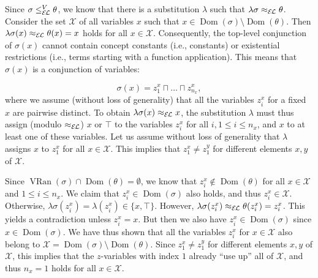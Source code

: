 \documentclass[10pt,a4paper]{amsart}
\begin{document}
 
 
Since $\sigma\leq_{\mathcal{E\mkern-1.618muL}}^{V}\theta$, we know that there is a substitution $\lambda$ such that $\lambda\sigma\approx_{\mathcal{E\mkern-1.618muL}}\theta$. Consider the set $\mathcal{X}$ of all variables $x$ such that $x\in\operatorname{Dom}(\sigma)\setminus\operatorname{Dom}(\theta)$. Then $\lambda\sigma(x)\approx_{\mathcal{E\mkern-1.618muL}}\theta(x)=x$ holds for all $x\in\mathcal{X}$. Consequently, the top-level conjunction of $\sigma(x)$ cannot contain concept constants (i.e., constants) or existential restrictions (i.e., terms starting with a function application). This means that $\sigma(x)$ is a conjunction of variables:\par
    \[\sigma(x)=z_{1}^{x}\sqcap\ldots\sqcap z_{n_{x}}^{x},\]    
where we assume (without loss of generality) that all the variables $z_{i}^{x}$ for a fixed $x$ are pairwise distinct. To obtain $\lambda\sigma(x)\approx_{\mathcal{E\mkern-1.618muL}}x$, the substitution $\lambda$ must thus assign (modulo $\approx_{\mathcal{E\mkern-1.618muL}}$) $x$ or $\top$ to the variables $z_{i}^{x}$ for all $i,1\leq i\leq n_{x}$, and $x$ to at least one of these variables. Let us assume without loss of generality that $\lambda$ assigns $x$ to $z_{1}^{x}$ for all $x\in\mathcal{X}$. This implies that $z_{1}^{x}\neq z_{1}^{y}$ for different elements $x,y$ of $\mathcal{X}$.\par
 
 
 
Since $\operatorname{VRan}(\sigma)\cap\operatorname{Dom}(\theta)=\emptyset$, we know that $z_{i}^{x}\not\in\operatorname{Dom}(\theta)$ for all $x\in\mathcal{X}$ and $1\leq i\leq n_{x}$. We claim that $z_{i}^{x}\in\operatorname{Dom}(\sigma)$ also holds, and thus $z_{i}^{x}\in\mathcal{X}$. Otherwise, $\lambda\sigma(z_{i}^{x})=\lambda(z_{i}^{x})\in\{x,\top\}$. However, $\lambda\sigma(z_{i}^{x})\approx_{\mathcal{E\mkern-1.618muL}}\theta(z_{i}^{x})=%
z_{i}^{x}$. This yields a contradiction unless $z_{i}^{x}=x$. But then we also have $z_{i}^{x}\in\operatorname{Dom}(\sigma)$ since $x\in\operatorname{Dom}(\sigma)$. We have thus shown that all the variables $z_{i}^{x}$ for $x\in\mathcal{X}$ also belong to $\mathcal{X}=\operatorname{Dom}(\sigma)\setminus\operatorname{Dom}(\theta)$. Since $z_{1}^{x}\neq z_{1}^{y}$ for different elements $x,y$ of $\mathcal{X}$, this implies that the $z$-variables with index $1$ already “use up” all of $\mathcal{X}$, and thus $n_{x}=1$ holds for all $x\in\mathcal{X}$.\par
 
\end{document}
